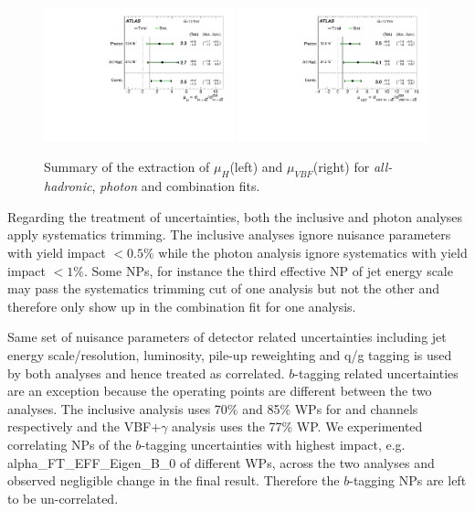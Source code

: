 \begin{figure}[htbp]
  \centering
  \includegraphics[width=0.49\textwidth]{figures/VBF/Plot_mu_summary_VBF.pdf}
  \includegraphics[width=0.49\textwidth]{figures/VBF/Plot_mu_summary_VBFonly.pdf}

\caption{Summary of the extraction of $\mu_{H}$(left) and $\mu_{VBF}$(right) for  \textit{all-hadronic}, \textit{photon} and combination fits.}
  \label{fig:vbf-summary}
\end{figure}




Regarding the treatment of uncertainties, both the inclusive and photon analyses apply systematics trimming. The inclusive analyses ignore nuisance parameters with yield impact $<0.5\%$ while the photon analysis ignore systematics with yield impact $<1\%$. Some NPs, for instance the third effective NP of jet energy scale may pass the systematics trimming cut of one analysis but not the other and therefore only show up in the combination fit for one analysis. 

Same set of nuisance parameters of detector related uncertainties including jet energy scale/resolution, luminosity, pile-up reweighting and q/g tagging is used by both analyses and hence treated as correlated.  $b$-tagging related uncertainties are an exception because the operating points are different between the two analyses. The inclusive analysis uses 70\% and 85\% WPs for \twocentral and \fourcentral channels respectively and the VBF$+\gamma$ analysis uses the 77\% WP. We experimented correlating NPs of the $b$-tagging uncertainties with highest impact, e.g. alpha\_FT\_EFF\_Eigen\_B\_0 of different WPs, across the two analyses and observed negligible change in the final result. Therefore the $b$-tagging NPs are left to be un-correlated.

